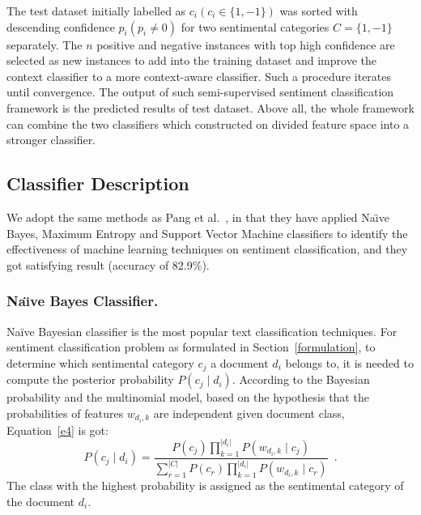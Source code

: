 \documentclass{llncs}
\begin{document}
The test dataset initially labelled as $ c_{i} \left( c_{i} \in \lbrace 1, -1\rbrace \right)$ was sorted with descending confidence $ p_{i} \left( p_{i} \neq 0 \right) $ for two sentimental categories $ C=\lbrace 1,-1\rbrace $ separately.
The $ n $  positive and negative instances with top high confidence are selected as new instances to add into the training dataset and improve the context classifier to a more context-aware classifier. 
Such a procedure iterates until convergence.
The output of such semi-supervised sentiment classification framework is the predicted results of test dataset. 
Above all, the whole framework can combine the two classifiers which constructed on divided feature space into a stronger classifier. 

\subsection{Classifier Description}
\label{classifier}

We adopt the same methods as Pang et al.~\cite{xsongx:b4}, in that they have applied Na\"\i ve Bayes, Maximum Entropy and Support Vector Machine classifiers to identify the effectiveness of machine learning techniques on sentiment classification, and they got satisfying result (accuracy of 82.9\%).
\subsubsection{Na\"\i ve Bayes Classifier.}
\label{bayes}
Naïve Bayesian classifier is the most popular text classification techniques.
For sentiment classification problem as formulated in Section~\ref{formulation}, to determine which sentimental category $ c_{j} $ a document $ d_{i} $ belongs to, it is needed to compute the posterior probability $ P \left(c_{j} \mid d_{i} \right)$. 
According to the Bayesian probability and the multinomial model, based on the hypothesis that the probabilities of features $ w_{d_{i},k} $ are independent given document class, Equation~\ref{e4} is got:
\begin{equation}
\label{e4}
P \left(c_{j} \mid d_{i} \right) = \frac{P \left( c_{j} \right)\prod_{k=1}^{| d_{i} |} P \left( w_{d_{i},k} \mid c_{j} \right)}{\sum_{r=1}^{|C|}P \left( c_{r} \right)\prod_{k=1}^{| d_{i} |} P \left( w_{d_{i},k} \mid c_{r} \right)} \enspace .
\end{equation}
The class with the highest probability is assigned as the sentimental category of the document $ d_{i} $. 
\end{document}
